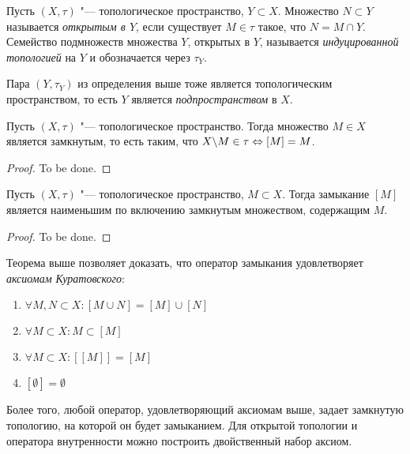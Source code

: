 \begin{definition}
	Пусть $(X, \tau)$ "--- топологическое пространство, $Y \subset X$. Множество $N \subset Y$ называется \textit{открытым в $Y$}, если существует $M \in \tau$ такое, что $N = M \cap Y$. Семейство подмножеств множества $Y$, открытых в $Y$, называется \textit{индуцированной топологией} на $Y$ и обозначается через $\tau_Y$.
\end{definition}

\begin{note}
	Пара $(Y, \tau_Y)$ из определения выше тоже является топологическим пространством, то есть $Y$ является \textit{подпространством} в $X$.
\end{note}

\begin{theorem}
	Пусть $(X, \tau)$ "--- топологическое пространство. Тогда множество $M \in X$ является замкнутым, то есть таким, что $X \backslash M \in \tau \Leftrightarrow [M] = M$.
\end{theorem}

\begin{proof}
	To be done.
\end{proof}

\begin{theorem}
	Пусть $(X, \tau)$ "--- топологическое пространство, $M \subset X$. Тогда замыкание $[M]$ является наименьшим по включению замкнутым множеством, содержащим $M$.
\end{theorem}
	
\begin{proof}
	To be done.
\end{proof}

\begin{note}
	Теорема выше позволяет доказать, что оператор замыкания удовлетворяет \textit{аксиомам Куратовского}:
	\begin{enumerate}
		\item $\forall M, N \subset X: [M \cup N] = [M] \cup [N]$
		\item $\forall M \subset X: M \subset [M]$
		\item $\forall M \subset X: [[M]] = [M]$
		\item $[\emptyset] = \emptyset$
	\end{enumerate}

	Более того, любой оператор, удовлетворяющий аксиомам выше, задает замкнутую топологию, на которой он будет замыканием. Для открытой топологии и оператора внутренности можно построить двойственный набор аксиом.
\end{note}

